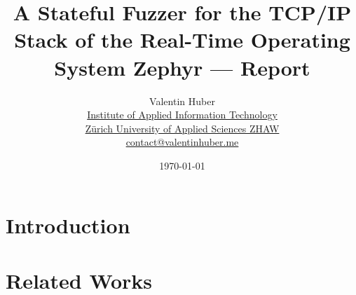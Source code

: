 \documentclass{article}
\title{%
\vspace{50px}%
    \Huge A Stateful Fuzzer for the TCP/IP Stack of the Real-Time Operating System Zephyr\break%
    —\break%
    Report%
    \vspace{250px}%
}
\author{%
  Valentin Huber\vspace{5px}\\%
  \small \href{https://www.zhaw.ch/en/engineering/institutes-centres/init/}{Institute of Applied Information Technology}\\%
  \small \href{https://www.zhaw.ch/en}{Zürich University of Applied Sciences ZHAW}\\%
  \small \href{mailto://contact@valentinhuber.me}{contact@valentinhuber.me}%
  \vspace{10px}
}
\date{\today\vspace{5px}}
\begin{document}
\maketitle






\clearpage\newpage

\tableofcontents

\section{Introduction}

\section{Related Works}
\end{document}

